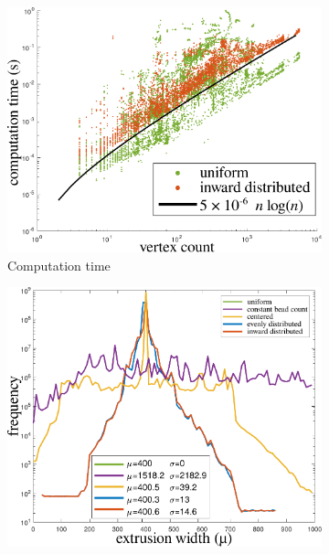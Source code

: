 \begin{figure}
\centering
\setlength{\figheight}{0.22\textwidth}
\setlength{\figwidth}{0.31\textwidth}
\begin{subfigure}{\figwidth}\centering
\includegraphics[height=\figheight]{sources-validation-computime2.pdf}
\caption{Computation time}
\label{computime}
\end{subfigure}
\begin{subfigure}{\figwidth}\centering
\includegraphics[height=\figheight]{sources-validation-widthHistogram.pdf}

\end{subfigure}
\end{figure}
